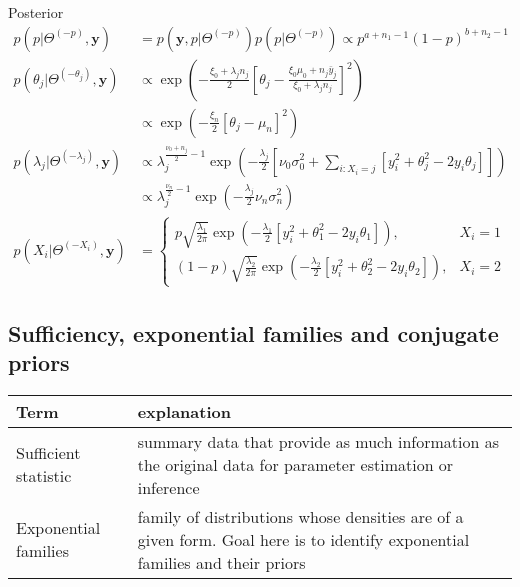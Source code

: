     Posterior
    \begin{align*}
        p(p|\Theta^{(-p)}, \mathbf{y})
        &= p(\mathbf{y}, p | \Theta^{(-p)})
        p(p|\Theta^{(-p)})
        \propto p^{a+n_1-1} (1-p)^{b+n_2 - 1}\\
        p(\theta_j|\Theta^{(-\theta_j)}, \mathbf{y})
        &\propto \exp\left(
            -\frac{ \xi_0 + \lambda_jn_j }{2}
            \left[
                \theta_j - \frac{\xi_0\mu_0 + n_j\bar{y}_j}
                { \xi_0 + \lambda_jn_j }
            \right]^2
        \right)\\
        &\propto \exp\left(
            -\frac{\xi_n}{2}[\theta_j - \mu_n]^2
        \right)\\
        p(\lambda_j|\Theta^{(-\lambda_j)}, \mathbf{y})
        &\propto \lambda_j^{\frac{\nu_0+n_j}{2}-1}
        \exp\left(
            -\frac{\lambda_j}{2}\left[
                \nu_0\sigma_0^2 + \sum_{i:X_i = j}
                [y_i^2+\theta_j^2-2y_i\theta_j]
            \right]
        \right)\\
        &\propto \lambda_j^{\frac{\nu_n}{2}-1}
        \exp\left(
            -\frac{\lambda_j}{2}\nu_n\sigma_n^2
        \right)\\
        p(X_i|\Theta^{(-X_i)}, \mathbf{y}) &=
        \begin{cases}
        p
        \sqrt{\frac{\lambda_1}{2\pi}}
        \exp\left(
            -\frac{\lambda_1}{2}
            [y_i^2 + \theta_1^2 - 2y_i\theta_1]
        \right), & X_i = 1\\
        (1-p)
        \sqrt{\frac{\lambda_2}{2\pi}}
        \exp\left(
            -\frac{\lambda_2}{2}
            [y_i^2 + \theta_2^2 - 2y_i\theta_2]
        \right), & X_i = 2
        \end{cases}
    \end{align*}

    \subsection{Sufficiency, exponential families and
    conjugate priors}
    
    \begin{tabulary}{\linewidth}{l L}
        \hline
        Term & explanation\\
        \hline
        \hline
        Sufficient statistic
        & summary data that provide as much information as
        the original data for parameter estimation or
        inference\\
        Exponential families
        & family of distributions whose densities are of a
        given form. Goal here is to identify exponential
        families and their priors
    \end{tabulary}

